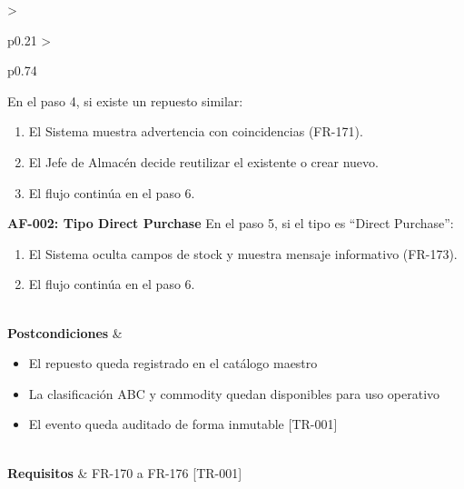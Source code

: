 \begin{longtable}{>{\raggedright\arraybackslash}p{0.21\textwidth} >{\raggedright\arraybackslash}p{0.74\textwidth}}
{\newline
En el paso 4, si existe un repuesto similar:
\begin{enumerate}[leftmargin=1.5em, nosep, topsep=0pt]
\item El Sistema muestra advertencia con coincidencias (FR-171).
\item El Jefe de Almacén decide reutilizar el existente o crear nuevo.
\item El flujo continúa en el paso 6.
\end{enumerate}
\vspace{4pt}\noindent\textbf{AF-002: Tipo Direct Purchase}
\newline
En el paso 5, si el tipo es ``Direct Purchase'':
\begin{enumerate}[leftmargin=1.5em, nosep, topsep=0pt]
\item El Sistema oculta campos de stock y muestra mensaje informativo (FR-173).
\item El flujo continúa en el paso 6.
\end{enumerate} \vspace{2pt}} \\
\textbf{Postcondiciones} & \parbox[t]{\linewidth}{\vspace{2pt} \begin{itemize}[leftmargin=1.5em, nosep, topsep=0pt]
\item El repuesto queda registrado en el catálogo maestro
\item La clasificación ABC y commodity quedan disponibles para uso operativo
\item El evento queda auditado de forma inmutable [TR-001]
\end{itemize} \vspace{2pt}} \\
\textbf{Requisitos} & FR-170 a FR-176 [TR-001] \\ \bottomrule
\end{longtable}\normalsize\vspace{1em}